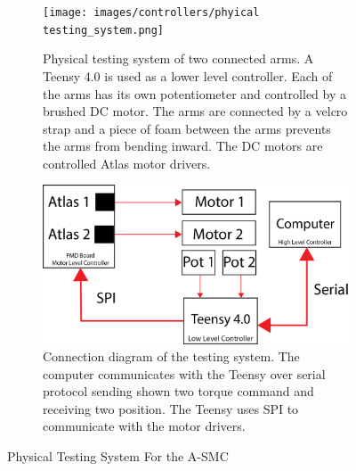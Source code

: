\begin{figure}
    \centering
    \begin{subfigure}{0.8\linewidth}
        \centering
        \texttt{[image: images/controllers/phyical testing\_system.png]}
        \caption[Physical A-SMC Testing System]{Physical testing system of two connected arms. A Teensy 4.0 is used as a lower level controller. Each of the arms has its own potentiometer and controlled by a brushed DC motor. The arms are connected by a velcro strap and a piece of foam between the arms prevents the arms from bending inward. The DC motors are controlled Atlas motor drivers. }
        \label{fig:phyicalTestingSystem}
    \end{subfigure}
    \begin{subfigure}{0.8\linewidth}
        \centering
        \includegraphics[width=\linewidth]{images/controllers/testing_system_diagam.png}
        \caption[Testing A-SMC System Diagram]{Connection diagram of the testing system. The computer communicates with the Teensy over serial protocol sending shown two torque command and receiving two position. The Teensy uses SPI to communicate with the motor drivers. }
        \label{fig:phyicalTestingDiagram}
    \end{subfigure}
    \caption{Physical Testing System For the A-SMC}
    \label{fig:ASMCTestingSystem}
\end{figure}










